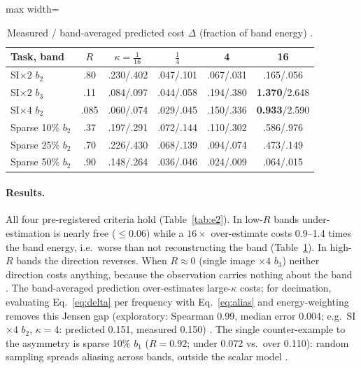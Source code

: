 \begin{table}[t]\centering\small
\caption{Measured / band-averaged predicted cost $\Delta$ (fraction of band
energy) .}\label{tab:e2cells}
\setlength{\tabcolsep}{3pt}
\begin{adjustbox}{max width=\linewidth}\begin{tabular}{lccccc}\toprule
Task, band & $R$ & $\kappa{=}\tfrac1{16}$ & $\tfrac14$ & 4 & 16\\\midrule
SI$\times2$ $b_2$ & .80 & .230/.402 & .047/.101 & .067/.031 & .165/.056\\
SI$\times2$ $b_3$ & .11 & .084/.097 & .044/.058 & .194/.380 & \textbf{1.370}/2.648\\
SI$\times4$ $b_2$ & .085 & .060/.074 & .029/.045 & .150/.336 & \textbf{0.933}/2.590\\
Sparse 10\% $b_2$ & .37 & .197/.291 & .072/.144 & .110/.302 & .586/.976\\
Sparse 25\% $b_2$ & .70 & .226/.430 & .068/.139 & .094/.074 & .473/.149\\
Sparse 50\% $b_2$ & .90 & .148/.264 & .036/.046 & .024/.009 & .064/.015\\
\bottomrule\end{tabular}\end{adjustbox}
\end{table}

\paragraph{Results.} All four pre-registered criteria hold
(Table~\ref{tab:e2}). In low-$R$ bands under-estimation is nearly free
($\le0.06$) while a $16\times$ over-estimate costs 0.9--1.4 times the band
energy, i.e.\ worse than not reconstructing the band
(Table~\ref{tab:e2cells}). In high-$R$ bands the direction reverses. When
$R\approx0$ (single image $\times4$ $b_3$) neither direction costs anything,
because the observation carries nothing about the band .
The band-averaged prediction over-estimates large-$\kappa$ costs; for
decimation, evaluating Eq.~\eqref{eq:delta} per frequency with
Eq.~\eqref{eq:alias} and energy-weighting removes this Jensen gap (exploratory:
Spearman 0.99, median error 0.004; e.g.\ SI$\times4$ $b_2$, $\kappa=4$:
predicted 0.151, measured 0.150) .
The single counter-example to the asymmetry is sparse 10\% $b_1$ ($R=0.92$;
under 0.072 vs.\ over 0.110): random sampling spreads aliasing across bands,
outside the scalar model .

